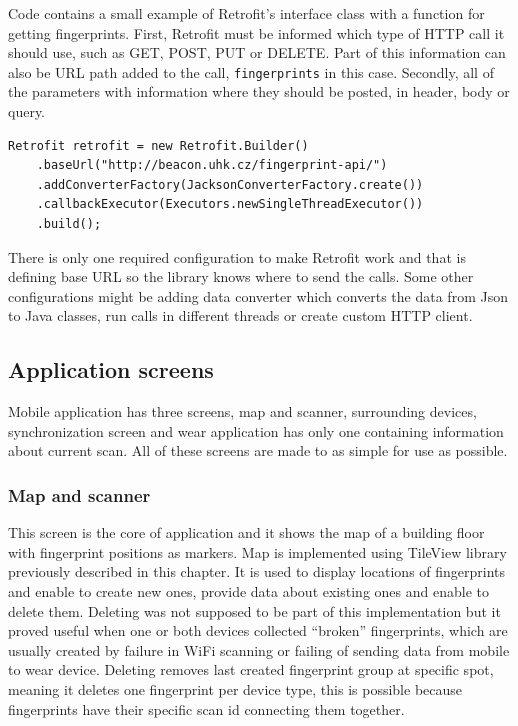 Code contains a small example of Retrofit's interface class with a function for getting fingerprints. First, Retrofit must be informed which type of HTTP call it should use, such as GET, POST, PUT or DELETE. Part of this information can also be URL path added to the call, \verb|fingerprints| in this case. Secondly, all of the parameters with information where they should be posted, in header, body or query.

\begin{lstlisting}[caption=Retrofit configuration example]
Retrofit retrofit = new Retrofit.Builder()
	.baseUrl("http://beacon.uhk.cz/fingerprint-api/")
	.addConverterFactory(JacksonConverterFactory.create())
	.callbackExecutor(Executors.newSingleThreadExecutor())
	.build();
\end{lstlisting}

There is only one required configuration to make Retrofit work and that is defining base URL so the library knows where to send the calls. Some other configurations might be adding data converter which converts the data from Json to Java classes, run calls in different threads or create custom HTTP client.

\subsection{Application screens}\label{subsec:ApplicationScreens}
Mobile application has three screens, map and scanner, surrounding devices, synchronization screen and wear application has only one containing information about current scan. All of these screens are made to as simple for use as possible.

\subsubsection{Map and scanner}\label{subsec:MapAndScanner}
This screen is the core of application and it shows the map of a building floor with fingerprint positions as markers. Map is implemented using TileView library previously described in this chapter. It is used to display locations of fingerprints and enable to create new ones, provide data about existing ones and enable to delete them. Deleting was not supposed to be part of this implementation but it proved useful when one or both devices collected \enquote{broken} fingerprints, which are usually created by failure in WiFi scanning or failing of sending data from mobile to wear device. Deleting removes last created fingerprint group at specific spot, meaning it deletes one fingerprint per device type, this is possible because fingerprints have their specific scan id connecting them together.

